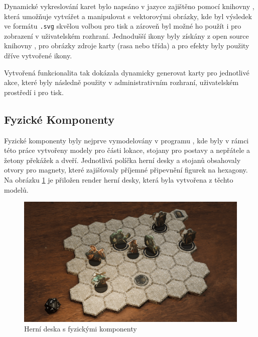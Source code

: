Dynamické vykreslování karet bylo napsáno v jazyce  zajištěno pomocí knihovny , která umožňuje vytvářet a manipulovat s vektorovými obrázky, kde byl výsledek ve formátu \texttt{.svg} skvělou volbou pro tisk a zároveň byl možné ho použít i pro zobrazení v uživatelském rozhraní. Jednodušší ikony byly získány z open source knihovny , pro obrázky zdroje karty (rasa nebo třída) a pro efekty byly použity dříve vytvořené ikony.

Vytvořená funkcionalita tak dokázala dynamicky generovat karty pro jednotlivé akce, které byly následně použity v administrativním rozhraní, uživatelském prostředí i pro tisk.

\subsection{Fyzické Komponenty}
\label{subsec:physical_components}

Fyzické komponenty byly nejprve vymodelovány v programu , kde byly v rámci této práce vytvořeny modely pro části lokace, stojany pro postavy a nepřátele a žetony překážek a dveří. Jednotlivá políčka herní desky a stojanů obsahovaly otvory pro magnety, které zajišťovaly příjemné připevnění figurek na hexagony. Na obrázku \ref{fig:game_board} je přiložen render herní desky, která byla vytvořena z těchto modelů.

\begin{figure}[h]
    \centering
    \includegraphics[width=\textwidth]{figures/images/game.png}
    \caption{Herní deska s fyzickými komponenty}
    \label{fig:game_board}
\end{figure}

